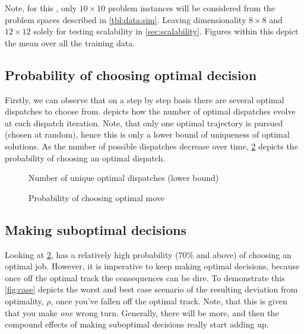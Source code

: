 \documentclass[smallextended]{svjour3}
\begin{document}
Note, for this , only $10\times10$ problem instances will be considered from the problem spaces described in \cref{tbl:data:sim}. Leaving dimensionality $8\times8$ and $12\times12$ solely for testing scalability in \cref{sec:scalability}. 
Figures within this  depict the mean over all the training data. %

\subsection{Probability of choosing optimal decision}\label{sec:opt:rnd}
Firstly, we can observe that on a step by step basis there are several optimal dispatches to choose from.  depicts how the number of optimal dispatches evolve at each dispatch iteration. Note, that only one optimal trajectory is pursued (chosen at random), hence this is only a lower bound of uniqueness of optimal solutions.
As the number of possible dispatches decrease over time, \cref{fig:opt} depicts the probability of choosing an optimal dispatch. 

\begin{figure}
\centering
{}%
\caption{Number of unique optimal dispatches (lower bound)}
\label{fig:opt:unique}
\end{figure}

\begin{figure}
\centering
{}%
\caption{Probability of choosing optimal move}
\label{fig:opt}
\end{figure}

\subsection{Making suboptimal decisions}\label{sec:opt:sub}
Looking at \cref{fig:opt},   has a relatively high probability ($70\%$ and above) of choosing an optimal job. However, it is imperative to keep making optimal decisions, because once off the optimal track the consequences can be dire. To demonstrate this \cref{fig:case} depicts the worst and best case scenario of the resulting deviation from optimality, $\rho$, once you've fallen off the optimal track. Note, that this is given that you make \emph{one} wrong turn. Generally, there will be more, and then the compound effects of making suboptimal decisions really start adding up. 
\end{document}
